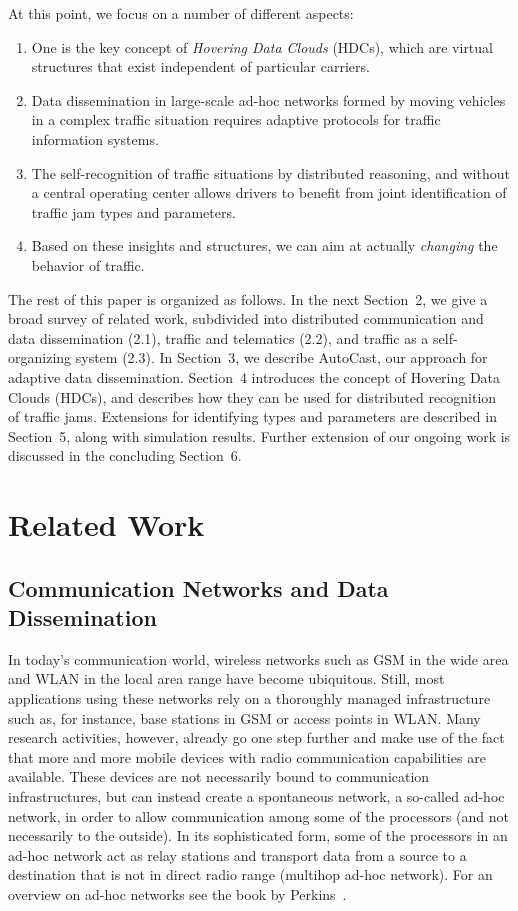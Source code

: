 \documentclass{acmrip}
\begin{document}
At this point, we focus on a number of different aspects:
\begin{enumerate}
\item One is the key concept of {\em
Hovering Data Clouds} (HDCs), which are virtual structures that
exist independent of particular carriers.
\item Data dissemination in large-scale ad-hoc networks formed by
moving vehicles in a complex traffic situation requires adaptive
protocols for traffic information systems.
\item The self-recognition of traffic situations by distributed reasoning,
and without a central operating center allows drivers to benefit
from joint identification of traffic jam types and parameters.
\item Based on these insights and structures, we can aim at actually
{\em changing} the behavior of traffic.
\end{enumerate}

The rest of this paper is organized as follows. In the next
Section~2, we give a broad survey of related work, subdivided into distributed communication
and data dissemination (2.1), traffic and telematics (2.2), and 
traffic as a self-organizing system (2.3).
In Section~3, we describe AutoCast, our approach for
adaptive data dissemination. Section~4 introduces the concept of
Hovering Data Clouds (HDCs), and describes how they can be used for
distributed recognition of traffic jams. Extensions for identifying
types and parameters are described in Section~5, along with
simulation results. Further extension of our ongoing work is
discussed in the concluding Section~6.

\section{Related Work}

\subsection{Communication Networks and Data Dissemination}

In today's communication world, wireless networks such as GSM in the
wide area and WLAN in the local area range have become ubiquitous.
Still, most applications using these networks rely on a thoroughly
managed infra\-structure such as, for instance, base stations in GSM
or access points in WLAN. Many research activities, however, already
go one step further and make use of the fact that more and more
mobile devices with radio communication capabilities are available.
These devices are not necessarily bound to communication
infrastructures, but can instead create a spontaneous network, a
so-called {ad-hoc network}, in order to allow communication among
some of the processors (and not necessarily to the outside). In its
sophisticated form, some of the processors in an ad-hoc network act
as relay stations and transport data from a source to a destination
that is not in direct radio range (multihop ad-hoc network). For an
overview on ad-hoc networks see the book by Perkins~\cite{p-ahn-01}.
\end{document}

